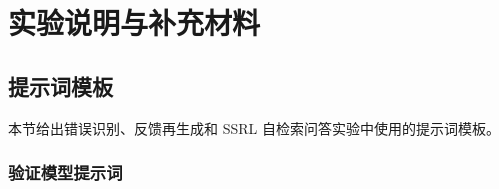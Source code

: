 
\chapter{实验说明与补充材料}
\label{chap:appendix-experiment-details}



\section{提示词模板}

本节给出错误识别、反馈再生成和 SSRL 自检索问答实验中使用的提示词模板。

\subsection{验证模型提示词}


